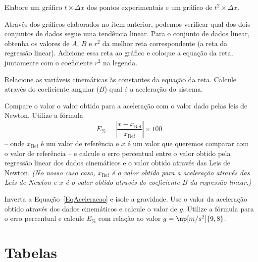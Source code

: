 \begin{question}[type={exam}]{2.5}
Elabore um gráfico $ t \times \Delta x$ dos pontos experimentais e um gráfico de $t^2 \times \Delta x$.
\end{question}

\begin{question}[type={exam}]{2}
Através dos gráficos elaborados no item anterior, podemos verificar qual dos dois conjuntos de dados segue uma tendência linear. Para o conjunto de dados linear, obtenha os valores de $A$, $B$ e $r^2$ da melhor reta correspondente (a reta da regressão linear). Adicione essa reta ao gráfico e coloque a equação da reta, juntamente com o coeficiente $r^2$ na legenda.
\end{question}

\begin{question}[type={exam}]{1.5}
Relacione as variáveis cinemáticas às constantes da equação da reta. Calcule através do coeficiente angular ($B$) qual é a aceleração do sistema.
\end{question}

\begin{question}[type={exam}]{1}
Compare o valor o valor obtido para a aceleração com o valor dado pelas leis de Newton. Utilize a fórmula
\begin{equation}
	E_\% = \left|\frac{x - x_{\textrm{Ref}}}{x_{\textrm{Ref}}}\right| \times 100
\end{equation}
%
-- onde $x_{\textrm{Ref}}$ é um valor de referência e $x$ é um valor que queremos comparar com o valor de referência -- e calcule o erro percentual entre o valor obtido pela regressão linear dos dados cinemáticos e o valor obtido através das Leis de Newton. \emph{(No nosso caso caso, $x_{\textrm{Ref}}$ é o valor obtido para a aceleração através das Leis de Newton e $x$ é o valor obtido através do coeficiente $B$ da regressão linear.)}
\end{question}

\begin{question}[type={exam}]{1}
Inverta a Equação~\eqref{EqAceleracao} e isole a gravidade. Use o valor da aceleração obtido através dos dados cinemáticos e calcule o valor de $g$. Utilize a fórmula para o erro percentual e calcule $E_\%$ com relação ao valor $g=\np[m/s^2]{9,8}$.
\end{question}

\vfill
\pagebreak
\section{Tabelas}

